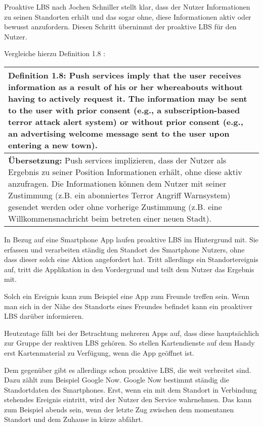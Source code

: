 Proaktive LBS nach Jochen Schniller stellt klar, dass der Nutzer Informationen zu seinen Standorten erhält und das sogar ohne, diese Informationen aktiv oder bewusst anzufordern. Diesen Schritt übernimmt der proaktive LBS für den Nutzer.

Vergleiche hierzu Definition 1.8 :

\begin{table}[h]
	\centering
	\begin{tabular}{|p{16cm}|}\hline
		\textbf{Definition 1.8:} \glqq Push services imply that the user receives information as a result of his or her whereabouts without having to actively request it. The information may be sent to the user with prior consent (e.g., a subscription-based terror attack alert system) or without prior consent (e.g., an advertising welcome message sent to the user upon entering a new town). \grqq \cite[S.20]{Schiller2004} \\ \hline
		\textbf{Übersetzung:} Push services implizieren, dass der Nutzer als Ergebnis zu seiner Position Informationen erhält, ohne diese aktiv anzufragen. Die Informationen können dem Nutzer mit seiner  Zustimmung (z.B. ein abonniertes Terror Angriff Warnsystem) gesendet werden oder ohne vorherige Zustimmung (z.B. eine Willkommensnachricht beim betreten einer neuen Stadt).\\ \hline
	\end{tabular}
\end{table}

In Bezug auf eine Smartphone App laufen proaktive LBS im Hintergrund mit. Sie erfassen und verarbeiten ständig den Standort des Smartphone Nutzers, ohne dass dieser solch eine Aktion angefordert hat. Tritt allerdings ein Standortereignis auf, tritt die Applikation in den Vordergrund und teilt dem Nutzer das Ergebnis mit. 

Solch ein Ereignis kann zum Beispiel eine App zum Freunde treffen sein. Wenn man sich in der Nähe des Standorts eines Freundes befindet kann ein proaktiver LBS darüber informieren. 


Heutzutage fällt bei der Betrachtung mehreren Apps auf, dass diese hauptsächlich zur Gruppe der reaktiven LBS gehören. So stellen Kartendienste auf dem Handy erst Kartenmaterial zu Verfügung, wenn die App geöffnet ist. 

Dem gegenüber gibt es allerdings schon proaktive LBS, die weit verbreitet sind. Dazu zählt zum Beispiel Google Now. Google Now bestimmt ständig die Standortdaten des Smartphones. Erst, wenn ein mit dem Standort in Verbindung stehendes Ereignis eintritt, wird der Nutzer den Service wahrnehmen. Das kann zum Beispiel abends sein, wenn der letzte Zug zwischen dem momentanen Standort und dem Zuhause in kürze abfährt.
